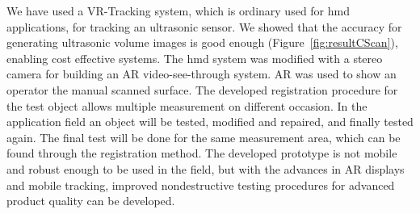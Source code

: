 \documentclass{VRARWorkshop}
\begin{document}
We have used a VR-Tracking system, which is ordinary used for {\sc hmd} applications, for tracking an ultrasonic sensor.
We showed that the accuracy for generating ultrasonic volume images is good enough (Figure~\ref{fig:resultCScan}), enabling cost effective systems.
The {\sc hmd} system was modified with a stereo camera for building an AR video-see-through system.
AR was used to show an operator the manual scanned surface.
The developed registration procedure for the test object allows multiple measurement on different occasion.
In the application field an object will be tested, modified and repaired, and finally tested again.
The final test will be done for the same measurement area, which can be found through the registration method.
The developed prototype is not mobile and robust enough to be used in the field, but with the advances in AR displays and mobile tracking, improved nondestructive testing procedures for advanced product quality can be developed.

\VRARsetbibstyle

\end{document}
